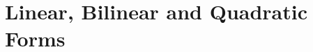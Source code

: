 \documentclass[a4paper, oneside]{book}
\begin{document}

\chapter{Linear, Bilinear and Quadratic Forms}
\end{document}
